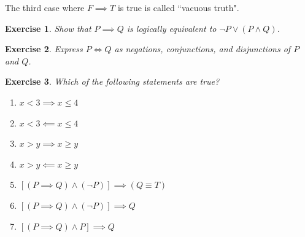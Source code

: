 \documentclass{article}[12pt]
\newtheorem{exercise}{Exercise}[section]
\begin{document}
            The third case where $F \implies T$ is true is called ``vacuous truth".
            
            \begin{exercise}
                Show that $P \implies Q$ is logically equivalent to $\neg P \lor (P \land Q)$.
            \end{exercise}
            \begin{exercise}
                Express $P \iff Q$ as negations, conjunctions, and disjunctions of $P$ and $Q$.
            \end{exercise}
            
            \begin{exercise}
                Which of the following statements are true?
                \begin{multicols}{2}
                    \begin{enumerate}
                        \item
                        $x < 3 \implies x \le 4$
                        
                        \item
                        $x < 3 \impliedby x \le 4$
                        
                        \item
                        $x > y \implies x \ge y$
                        
                        \item
                        $x > y \impliedby x \ge y$
                        
                        \item
                        $[(P \implies Q) \land (\neg P)] \implies  (Q \equiv T)$
                        
                        \item
                        $[(P \implies Q) \land (\neg P)] \implies  Q$
                        
                        \item
                        $[(P \implies Q) \land P] \implies Q$
                        
                        
                        
                        
                    \end{enumerate}
                \end{multicols}
            \end{exercise}
        
\end{document}
